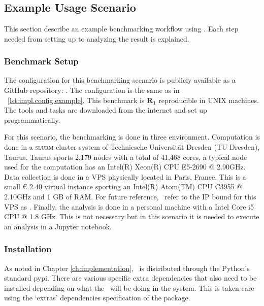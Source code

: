 \chapter{\chEvaluation}
\label{ch:evaluation}


\section{Example Usage Scenario}
\label{sec:eval.scenario}

This section describe an example benchmarking workflow using \OurBenchmarkingTool.
Each step needed from setting up to analyzing the result is explained.

\subsection{Benchmark Setup}

The configuration for this benchmarking scenario is publicly available as a GitHub repository: \href{https://github.com/rkkautsar/benchmark-demo-sat}{}.
The configuration is the same as in \lst~\ref{lst:impl.config.example}.
This benchmark is \(\bm{R_1}\) reproducible in UNIX machines.
The tools and tasks are downloaded from the internet and set up programmatically.

For this scenario, the benchmarking is done in three environment.
Computation is done in a \textsc{slurm} cluster system of Technicsche Universität Dresden (TU Dresden), Taurus.
Taurus sports 2,179 nodes with a total of 41,468 cores, a typical node used for the computation has an Intel(R) Xeon(R) CPU E5-2690 @ 2.90GHz.
Data collection is done in a VPS physically located in Paris, France.
This is a small € 2.40 virtual instance sporting an Intel(R) Atom(TM) CPU C3955 @ 2.10GHz and 1 GB of RAM.
For future reference, \first~refer to the IP bound for this VPS as .
Finally, the analysis is done in a personal machine with a Intel Core i5 CPU @ 1.8 GHz.
This is not necessary but in this scenario it is needed to execute an analysis in a Jupyter notebook.

\subsection{Installation}

As noted in Chapter \ref{ch:implementation}, \OurBenchmarkingTool~is distributed through the Python's standard pypi.
There are various specific extra dependencies that also need to be installed depending on what the \OurBenchmarkingTool~will be doing in the system.
This is taken care using the `extras' dependencies specification of the package.

